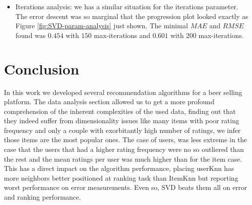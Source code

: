 \documentclass[letterpaper, 10 pt, conference]{ieeeconf}  %
\begin{document}
\begin{enumerate}
\begin{itemize}
        \item Iterations analysis: we has a similar situation for the iterations parameter. The error descent was so marginal that the progression plot looked exactly as Figure \ref{fig:SVD-param-analysis} just shown. The minimal $MAE$ and $RMSE$ found was $0.454$ with $150$ max-iterations and $0.601$ with $200$ max-iterations.
        
    \end{itemize}
    
\end{enumerate}

\section{Conclusion}

In this work we developed several recommendation algorithms for a beer selling platform. The data analysis section allowed us to get a more profound comprehension of the inherent complexities of the used data, finding out that they indeed suffer from dimensionality issues like many items with poor rating frequency and only a couple with exorbitantly high number of ratings,  we infer those items are the most popular ones. The case of users, was less extreme in the case that the users that had a higher rating frequency were no so outliered than the rest and the mean ratings per user was much higher than for the item case. This has a direct impact on the algorithm performance, placing userKnn has more neighbors better positioned at ranking task than ItemKnn but reporting worst performance on error measurements. Even so, SVD beats them all on error and ranking performance.



\addtolength{\textheight}{-12cm}   %
\end{document}
